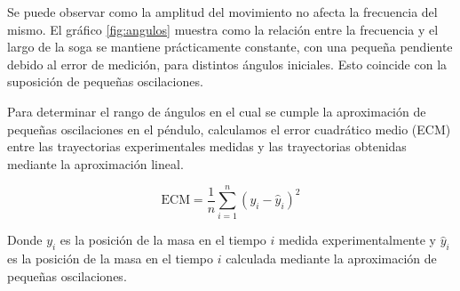 \documentclass[12pt,a4]{article}
\begin{document}
Se puede observar como la amplitud del movimiento no afecta la frecuencia del mismo. El gráfico \ref{fig:angulos} muestra como la relación entre la frecuencia y el largo de la soga se mantiene prácticamente constante, con una pequeña pendiente debido al error de medición, para distintos ángulos iniciales. Esto coincide con la suposición de pequeñas oscilaciones.

Para determinar el rango de ángulos en el cual se cumple la aproximación de pequeñas oscilaciones en el péndulo, calculamos el error cuadrático medio (ECM) entre las trayectorias experimentales medidas y las trayectorias obtenidas mediante la aproximación lineal. 

\[
\text{ECM} = \frac{1}{n} \sum_{i=1}^{n} (y_i - \hat{y}_i)^2
\]

Donde $y_i$ es la posición de la masa en el tiempo $i$ medida experimentalmente y $\hat{y}_i$ es la posición de la masa en el tiempo $i$ calculada mediante la aproximación de pequeñas oscilaciones.
\end{document}
